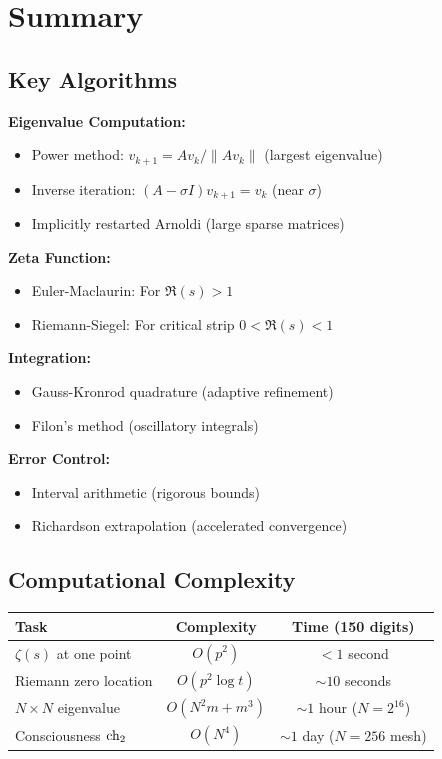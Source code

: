 \section{Summary}
\label{sec:summary-ch29}

\subsection{Key Algorithms}

\begin{tcolorbox}[colback=yellow!10!white, colframe=orange!75!black, title=Essential Algorithms]
\textbf{Eigenvalue Computation:}
\begin{itemize}
\item Power method: $v_{k+1} = Av_k/\|Av_k\|$ (largest eigenvalue)
\item Inverse iteration: $(A-\sigma I)v_{k+1} = v_k$ (near $\sigma$)
\item Implicitly restarted Arnoldi (large sparse matrices)
\end{itemize}

\textbf{Zeta Function:}
\begin{itemize}
\item Euler-Maclaurin: For $\Re(s) > 1$
\item Riemann-Siegel: For critical strip $0 < \Re(s) < 1$
\end{itemize}

\textbf{Integration:}
\begin{itemize}
\item Gauss-Kronrod quadrature (adaptive refinement)
\item Filon's method (oscillatory integrals)
\end{itemize}

\textbf{Error Control:}
\begin{itemize}
\item Interval arithmetic (rigorous bounds)
\item Richardson extrapolation (accelerated convergence)
\end{itemize}
\end{tcolorbox}

\subsection{Computational Complexity}

\begin{center}
\begin{tabular}{|l|c|c|}
\hline
\textbf{Task} & \textbf{Complexity} & \textbf{Time (150 digits)} \\
\hline
$\zeta(s)$ at one point & $O(p^2)$ & $< 1$ second \\
Riemann zero location & $O(p^2 \log t)$ & $\sim 10$ seconds \\
$N \times N$ eigenvalue & $O(N^2 m + m^3)$ & $\sim 1$ hour ($N=2^{16}$) \\
Consciousness $\mathrm{ch}_2$ & $O(N^4)$ & $\sim 1$ day ($N=256$ mesh) \\
\hline
\end{tabular}
\end{center}

